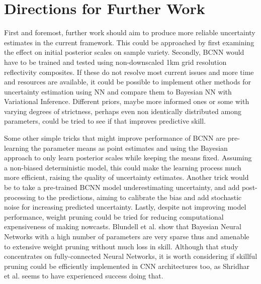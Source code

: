 \section{Directions for Further Work}

First and foremost, further work should aim to produce more reliable uncertainty estimates in the current framework. This could be approached by first examining the effect on initial posterior scales on sample variety. Secondly, BCNN would have to be trained and tested using non-downscaled 1km grid resolution reflectivity composites. If these do not resolve most current issues and more time and resources are available, it could be possible to implement other methods for uncertainty estimation using NN and compare them to Bayesian NN with Variational Inference. Different priors, maybe more informed ones or some with varying degrees of strictness, perhaps even non identically distributed among parameters, could be tried to see if that improves predictive skill.

Some other simple tricks that might improve performance of BCNN are pre-learning the parameter means as point estimates and using the Bayesian approach to only learn posterior scales while keeping the means fixed. Assuming a non-biased deterministic model, this could make the learning process much more efficient, raising the quality of uncertainty estimates. Another trick would be to take a pre-trained BCNN model underestimating uncertainty, and add post-processing to the predictions, aiming to calibrate the bias and add stochastic noise for increasing predicted uncertainty. Lastly, despite not improving model performance, weight pruning could be tried for reducing computational expensiveness of making nowcasts. Blundell et al. \cite{blundell_weight_2015} show that Bayesian Neural Networks with a high number of parameters are very sparse thus and amenable to extensive weight pruning without much loss in skill. Although that study concentrates on fully-connected Neural Networks, it is worth considering if skillful pruning could be efficiently implemented in CNN architectures too, as Shridhar et al. \cite{shridhar_comprehensive_2019} seems to have experienced success doing that. 

